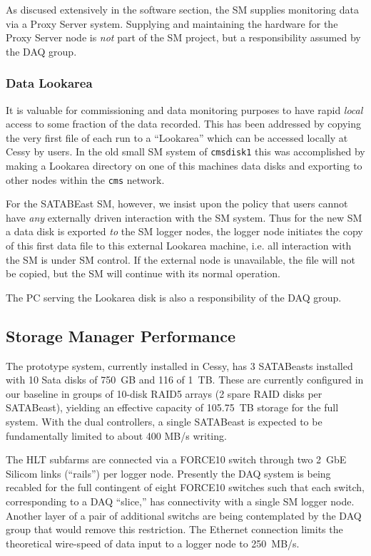 As discused extensively in the software section, the SM supplies monitoring
data via a Proxy Server system.
Supplying and maintaining the hardware for the Proxy Server node 
is {\it not} part of the SM project, but a responsibility assumed by the DAQ group.


\subsubsection{Data Lookarea}

It is valuable for commissioning and data monitoring purposes to have rapid
{\it local} access to some fraction of the data recorded.
This has been addressed by copying the very first file of each run 
to a ``Lookarea'' which can be accessed locally at Cessy by users.
In the old small SM system of  \verb+cmsdisk1+ this was accomplished
by making a Lookarea directory on one of this machines data disks and
exporting to other nodes within the \verb+cms+ network.


For the SATABEast SM, however, we insist upon the policy that users
cannot have {\it any} externally driven interaction with the SM system.
Thus for the new SM a data disk is exported {\it to} the SM logger nodes,
the logger node initiates the copy of this first data file to this
external Lookarea machine, i.e. all interaction with the SM is under
SM control.
If the external node is unavailable, the file will not be copied, but
the SM will continue with its normal operation.

The PC serving the Lookarea disk is also a responsibility of the DAQ group.




\subsection{Storage Manager Performance}

The prototype system, currently installed in Cessy, has
3 SATABeasts installed  with 10 Sata disks of 750~GB  and 116 of 1~TB.
These are currently configured in our baseline in groups of 10-disk RAID5 arrays 
(2 spare RAID disks per SATABeast), yielding an effective capacity of 105.75~TB storage
for the full system.
With the dual controllers, a single SATABeast is expected to be fundamentally 
limited to about 400 MB/s writing.

The HLT subfarms are connected via a FORCE10 switch through
two 2~GbE Silicom links (``rails'') per logger node.
Presently the DAQ system is being recabled for the full contingent of eight FORCE10 switches
such that each switch, corresponding to a DAQ ``slice,'' has connectivity with 
a single SM logger node.
Another layer of a pair of additional switchs are being contemplated by the DAQ group
that would remove this restriction.
The Ethernet connection limits the theoretical wire-speed of data input
to a logger node to 250~MB/s.

